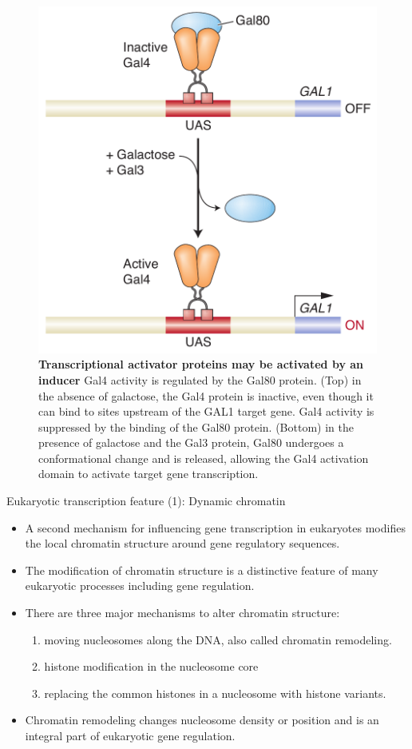 \documentclass[11pt,dvipsnames,ignorenonframetext,aspectratio=169]{beamer}
\providecommand{\tightlist}{%
  \setlength{\itemsep}{0pt}\setlength{\parskip}{0pt}}
\begin{document}
\begin{frame}{}
\protect\hypertarget{section-18}{}
\begin{figure}
\includegraphics[width=0.4\linewidth]{../images/transcriptional_activator_proteins_inducer} \caption{\textbf{Transcriptional activator proteins may be activated by an inducer} \newline Gal4 activity is regulated by the Gal80 protein. (Top) in the absence of galactose, the Gal4 protein is inactive, even though it can bind to sites upstream of the GAL1 target gene. Gal4 activity is suppressed by the binding of the Gal80 protein. (Bottom) in the presence of galactose and the Gal3 protein, Gal80 undergoes a conformational change and is released, allowing the Gal4 activation domain to activate target gene transcription.}\label{fig:inducer-proteins}
\end{figure}
\end{frame}

\begin{frame}{Eukaryotic transcription feature (1): Dynamic chromatin}
\protect\hypertarget{eukaryotic-transcription-feature-1-dynamic-chromatin}{}
\begin{itemize}
\tightlist
\item
  A second mechanism for influencing gene transcription in eukaryotes
  modifies the local chromatin structure around gene regulatory
  sequences.
\item
  The modification of chromatin structure is a distinctive feature of
  many eukaryotic processes including gene regulation.
\item
  There are three major mechanisms to alter chromatin structure:

  \begin{enumerate}
  \tightlist
  \item
    moving nucleosomes along the DNA, also called chromatin remodeling.
  \item
    histone modification in the nucleosome core
  \item
    replacing the common histones in a nucleosome with histone variants.
  \end{enumerate}
\item
  Chromatin remodeling changes nucleosome density or position and is an
  integral part of eukaryotic gene regulation.
\end{itemize}
\end{frame}
\end{document}
